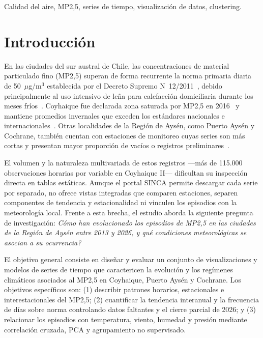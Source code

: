 \documentclass[conference]{IEEEtran}
\begin{document}
\begin{IEEEkeywords}
Calidad del aire, MP2,5, series de tiempo, visualizaci{\'o}n de datos, clustering.
\end{IEEEkeywords}

\section{Introducci{\'o}n}

En las ciudades del sur austral de Chile, las concentraciones de material particulado fino (MP2,5) superan de forma recurrente la norma primaria diaria de 50~$\mu$g/m$^3$ establecida por el Decreto Supremo N\textdegree~12/2011~\cite{mma2011ds12}, debido principalmente al uso intensivo de le{\~n}a para calefacci{\'o}n domiciliaria durante los meses fr{\'i}os~\cite{molina2017}. Coyhaique fue declarada zona saturada por MP2,5 en 2016~\cite{mma2016ds15} y mantiene promedios invernales que exceden los est{\'a}ndares nacionales e internacionales~\cite{solis2022}. Otras localidades de la Regi{\'o}n de Ays{\'e}n, como Puerto Ays{\'e}n y Cochrane, tambi{\'e}n cuentan con estaciones de monitoreo cuyas series son m{\'a}s cortas y presentan mayor proporci{\'o}n de vac{\'i}os o registros preliminares~\cite{sinca2026}.

El volumen y la naturaleza multivariada de estos registros ---m{\'a}s de 115.000 observaciones horarias por variable en Coyhaique II--- dificultan su inspecci{\'o}n directa en tablas est{\'a}ticas. Aunque el portal SINCA permite descargar cada serie por separado, no ofrece vistas integradas que comparen estaciones, separen componentes de tendencia y estacionalidad ni vinculen los episodios con la meteorolog{\'i}a local. Frente a esta brecha, el estudio aborda la siguiente pregunta de investigaci{\'o}n: \textit{{\textquestiondown}C{\'o}mo han evolucionado los episodios de MP2,5 en las ciudades de la Regi{\'o}n de Ays{\'e}n entre 2013 y 2026, y qu{\'e} condiciones meteorol{\'o}gicas se asocian a su ocurrencia?}

El objetivo general consiste en dise{\~n}ar y evaluar un conjunto de visualizaciones y modelos de series de tiempo que caractericen la evoluci{\'o}n y los reg{\'i}menes clim{\'a}ticos asociados al MP2,5 en Coyhaique, Puerto Ays{\'e}n y Cochrane. Los objetivos espec{\'i}ficos son: (1) describir patrones horarios, estacionales e interestacionales del MP2,5; (2) cuantificar la tendencia interanual y la frecuencia de d{\'i}as sobre norma controlando datos faltantes y el cierre parcial de 2026; y (3) relacionar los episodios con temperatura, viento, humedad y presi{\'o}n mediante correlaci{\'o}n cruzada, PCA y agrupamiento no supervisado.
\end{document}
